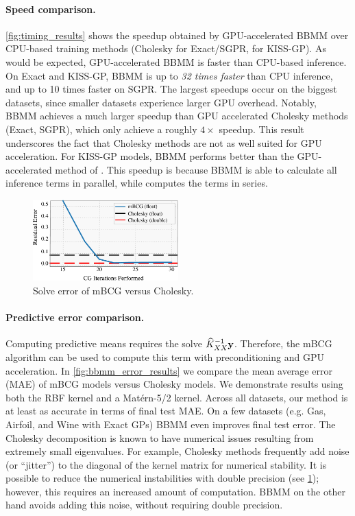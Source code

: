 \paragraph{Speed comparison.}
\cref{fig:timing_results} shows the speedup obtained by GPU-accelerated BBMM over CPU-based training methods (Cholesky for Exact/SGPR, \citet{dong2017scalable} for KISS-GP).
As would be expected, GPU-accelerated BBMM is faster than CPU-based inference.
On Exact and KISS-GP, BBMM is up to \emph{32 times faster} than CPU inference, and up to 10 times faster on SGPR.
The largest speedups occur on the biggest datasets, since smaller datasets experience larger GPU overhead.
Notably, BBMM achieves a much larger speedup than GPU accelerated Cholesky methods (Exact, SGPR), which only achieve a roughly $4\times$ speedup.
This result underscores the fact that Cholesky methods are not as well suited for GPU acceleration.
For KISS-GP models, BBMM performs better than the GPU-accelerated method of \citet{dong2017scalable}.
This speedup is because BBMM is able to calculate all inference terms in parallel, while \citet{dong2017scalable} computes the terms in series.

\begin{figure}[t!]
  \begin{center}
    \includegraphics[width=0.50\textwidth]{figures/cg_error}
  \end{center}
  \caption{Solve error of mBCG versus Cholesky. \label{fig:cg_error}}
\end{figure}

\paragraph{Predictive error comparison.}
Computing predictive means requires the solve $\widehat{K}_{XX}^{-1} \mathbf{y}$.
Therefore, the mBCG algorithm can be used to compute this term with preconditioning and GPU acceleration.
In \cref{fig:bbmm_error_results} we compare the mean average error (MAE) of mBCG models versus Cholesky models.
We demonstrate results using both the RBF kernel and a Mat\'ern-5/2 kernel.
Across all datasets, our method is at least as accurate in terms of final test MAE.
On a few datasets (e.g. Gas, Airfoil, and Wine with Exact GPs) BBMM even improves final test error.
The Cholesky decomposition is known to have numerical issues resulting from extremely small eigenvalues.
For example, Cholesky methods frequently add noise (or ``jitter'') to the diagonal of the kernel matrix for numerical stability.
It is possible to reduce the numerical instabilities with double precision (see \cref{fig:cg_error}); however, this requires an increased amount of computation.
BBMM on the other hand avoids adding this noise, without requiring double precision.

